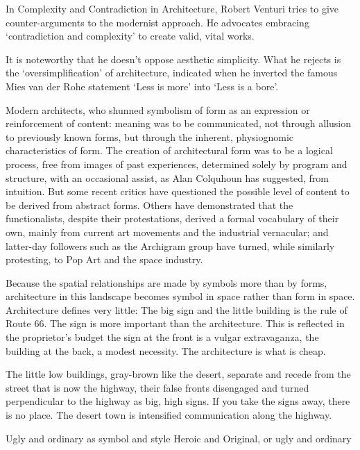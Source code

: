 
    In Complexity and Contradiction in Architecture, Robert Venturi tries to give counter-arguments to the modernist approach. He advocates embracing ‘contradiction and complexity’ to create valid, vital works.\cite{Lutolli2020}


    It is noteworthy that he doesn’t oppose aesthetic simplicity. What he rejects is the ‘oversimplification’ of architecture, indicated when he inverted the famous Mies van der Rohe statement ‘Less is more’ into ‘Less is a bore’.\cite{Lutolli2020}

    Modern architects, who shunned symbolism of form  as  an expression or reinforcement of content: meaning was  to  be  communicated,  not  through  allusion  to  previously  known forms, but through the inherent, physiognomic characteristics of form. 
    The creation of architectural form was to be a logical process, free  from images  of past experiences, determined solely by program and structure, with an  occasional  assist,  as  Alan Colquhoun has  suggested, from  intuition. 
    But some recent critics  have  questioned  the possible level of content to  be derived  from  abstract forms.  
    Others have  demonstrated that the functionalists,  despite  their protestations, derived  a  formal vocabulary of their own, mainly from current art movements and the industrial vernacular;  
    and  latter-day  followers  such  as  the  Archigram  group  have turned,  while  similarly  protesting,  to Pop  Art and  the space  industry.\cite{Venturi1972}

    Because the spatial relationships are made by symbols more than by forms, architecture in this landscape becomes symbol in space rather than form in space.
    Architecture defines very little: The big sign and the little building is the rule of Route 66.
    The sign is more important than the architecture.
    This is reflected in the proprietor's budget the sign at the front is a vulgar extravaganza, the building at the back, a modest necessity.
    The architecture is what is cheap.\cite{Venturi1972}

    The little low buildings, gray-brown like the desert, separate and recede from the street that is now the highway, their false fronts disengaged and turned perpendicular to the highway as big, high signs.
    If you take the signs away, there is no place.
    The desert town is intensified communication along the highway.\cite{Venturi1972}

    Ugly and ordinary as symbol and style
    Heroic and Original, or ugly and ordinary

